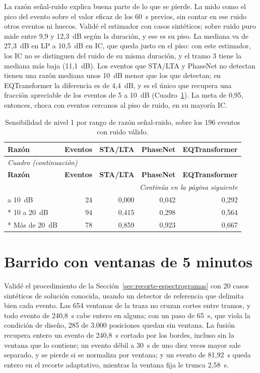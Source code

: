 \documentclass[12pt,oneside,spanish,oldfontcommands]{memoir}
\begin{document}
La razón señal-ruido explica buena parte de lo que se pierde. La mido como el
pico del evento sobre el valor eficaz de los 60~s previos, sin contar en ese
ruido otros eventos ni huecos. Validé el estimador con casos sintéticos; sobre
ruido puro mide entre 9,9 y 12,3~dB según la duración, y ese es su piso. La
mediana va de 27,3~dB en LP a 10,5~dB en IC, que queda justo en el piso: con
este estimador, los IC no se distinguen del ruido de su misma duración, y el
tramo 3 tiene la mediana más baja (11,1~dB). Los eventos que STA/LTA y
PhaseNet no detectan tienen una razón mediana unos 10~dB menor que los que
detectan; en EQTransformer la diferencia es de 4,4~dB, y es el único que
recupera una fracción apreciable de los eventos de 5 a 10~dB
(Cuadro~\ref{tab:snr}). La meta de 0,95, entonces, choca con eventos cercanos
al piso de ruido, en su mayoría IC.

{\small
\begin{longtable}{lrrrr}
\caption{Sensibilidad de nivel 1 por rango de razón señal-ruido, sobre los 196 eventos con ruido válido.}\label{tab:snr}\\
\toprule
\textbf{Razón} & \textbf{Eventos} & \textbf{STA/LTA} & \textbf{PhaseNet} & \textbf{EQTransformer} \\
\midrule
\endfirsthead
\multicolumn{5}{l}{\itshape Cuadro \thetable{} (continuación)}\\
\toprule
\textbf{Razón} & \textbf{Eventos} & \textbf{STA/LTA} & \textbf{PhaseNet} & \textbf{EQTransformer} \\
\midrule
\endhead
\midrule
\multicolumn{5}{r}{\itshape Continúa en la página siguiente}\\
\endfoot
\bottomrule
\endlastfoot
5 a 10~dB & 24 & 0,000 & 0,042 & 0,292 \\*
10 a 20~dB & 94 & 0,415 & 0,298 & 0,564 \\*
Más de 20~dB & 78 & 0,859 & 0,923 & 0,667 \\
\end{longtable}
}

\section{Barrido con ventanas de 5 minutos}
\label{sec:det-ventanas}

Validé el procedimiento de la Sección~\ref{sec:recorte-espectrogramas} con 20
casos sintéticos de solución conocida, usando un detector de referencia que
delimita bien cada evento. Las 654 ventanas de la traza no cruzan cortes entre
tramos, y todo evento de 240,8~s cabe entero en alguna; con un paso de 65~s,
que viola la condición de diseño, 285 de 3.000 posiciones quedan sin ventana.
La fusión recupera entero un evento de 240,8~s cortado por los bordes, incluso
sin la ventana que lo contiene; un evento débil a 30~s de uno diez veces mayor
sale separado, y se pierde si se normaliza por ventana; y un evento de
81,92~s queda entero en el recorte adaptativo, mientras la ventana fija le
trunca 2,58~s.
\end{document}
